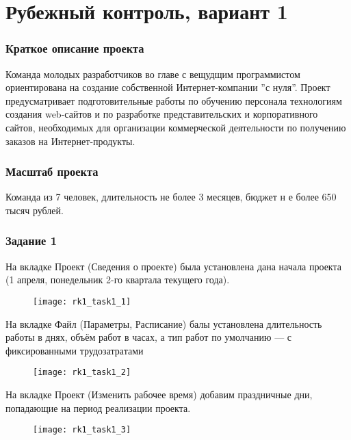 \chapter{Рубежный контроль, вариант 1}

\subsection*{Краткое описание проекта}

Команда молодых разработчиков во главе с вещудщим программистом ориентирована на создание собственной Интернет-компании ''с нуля''. Проект предусматривает подготовительные работы по обучению персонала технологиям создания web-сайтов и по разработке представительских и корпоративного сайтов, необходимых для организации коммерческой деятельности по получению заказов на Интернет-продукты.

\subsection*{Масштаб проекта}

Команда из 7 человек, длительность не более 3 месяцев, бюджет н е более 650 тысяч рублей.


\subsection*{Задание 1}

На вкладке Проект (Сведения о проекте) была установлена дана начала проекта (1 апреля, понедельник 2-го квартала текущего года).

\begin{figure}[h!]
	\texttt{[image: rk1\_task1\_1]}
\end{figure}

\clearpage

На вкладке Файл (Параметры, Расписание) балы установлена длительность работы в днях, объём работ в часах, а тип работ по умолчанию --- с фиксированными трудозатратами

\begin{figure}[h!]
	\texttt{[image: rk1\_task1\_2]}
\end{figure}

На вкладке Проект (Изменить рабочее время) добавим праздничные дни, попадающие на период реализации проекта.

\begin{figure}[h!]
	\texttt{[image: rk1\_task1\_3]}
\end{figure}

